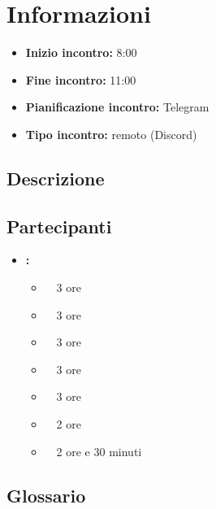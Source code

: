 \section{Informazioni}
\begin{itemize}
	\item \textbf{Inizio incontro:} 8:00
	\item \textbf{Fine incontro:} 11:00
	\item \textbf{Pianificazione incontro:} Telegram
	\item \textbf{Tipo incontro:} remoto (Discord)
\end{itemize}

\subsection{Descrizione}
\DocDescription

\subsection{Partecipanti}

\begin{itemize}
	\item \textbf{\GroupName:}
	\begin{itemize}
		\item \tommaso \ \rightarrow\ 3 ore
		\item \marco \ \rightarrow\ 3 ore
		\item \riccardo \ \rightarrow\ 3 ore
		\item \raul \ \rightarrow\ 3 ore
		\item \martina \ \rightarrow\ 3 ore
		\item \sebastiano \ \rightarrow\ 2 ore
		\item \mattia \ \rightarrow\ 2 ore e 30 minuti
	\end{itemize}
\end{itemize}

\subsection{Glossario}
\GlossarioIntroduzione

\clearpage
